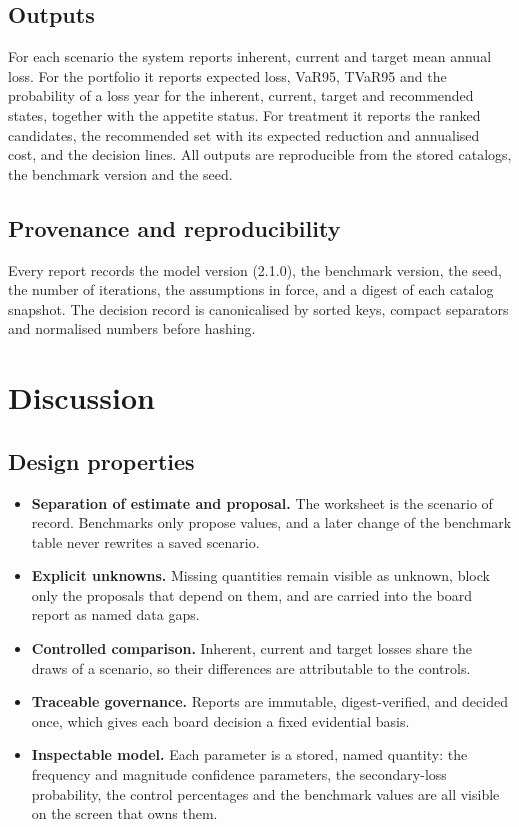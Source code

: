 \documentclass[11pt,a4paper]{article}
\begin{document}
\subsection{Outputs}
For each scenario the system reports inherent, current and target mean annual loss. For the portfolio it reports expected loss, VaR95, TVaR95 and the probability of a loss year for the inherent, current, target and recommended states, together with the appetite status. For treatment it reports the ranked candidates, the recommended set with its expected reduction and annualised cost, and the decision lines. All outputs are reproducible from the stored catalogs, the benchmark version and the seed.

\subsection{Provenance and reproducibility}
Every report records the model version (2.1.0), the benchmark version, the seed, the number of iterations, the assumptions in force, and a digest of each catalog snapshot. The decision record is canonicalised by sorted keys, compact separators and normalised numbers before hashing.

\section{Discussion}

\subsection{Design properties}
\begin{itemize}
  \item \textbf{Separation of estimate and proposal.} The worksheet is the scenario of record. Benchmarks only propose values, and a later change of the benchmark table never rewrites a saved scenario.
  \item \textbf{Explicit unknowns.} Missing quantities remain visible as unknown, block only the proposals that depend on them, and are carried into the board report as named data gaps.
  \item \textbf{Controlled comparison.} Inherent, current and target losses share the draws of a scenario, so their differences are attributable to the controls.
  \item \textbf{Traceable governance.} Reports are immutable, digest-verified, and decided once, which gives each board decision a fixed evidential basis.
  \item \textbf{Inspectable model.} Each parameter is a stored, named quantity: the frequency and magnitude confidence parameters, the secondary-loss probability, the control percentages and the benchmark values are all visible on the screen that owns them.
\end{itemize}
\end{document}
